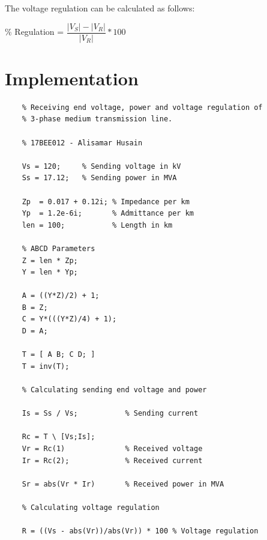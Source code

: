 \documentclass[a4paper,12pt]{article}
\begin{document}
    The voltage regulation can be calculated as follows:

      \begin{center}
        \% Regulation = $ \dfrac{|V_S| - |V_R|}{|V_R|} * 100 $
      \end{center}

  \section{Implementation}
  \begin{lstlisting}
    % Receiving end voltage, power and voltage regulation of
    % 3-phase medium transmission line.

    % 17BEE012 - Alisamar Husain

    Vs = 120;     % Sending voltage in kV
    Ss = 17.12;   % Sending power in MVA

    Zp  = 0.017 + 0.12i; % Impedance per km
    Yp  = 1.2e-6i;       % Admittance per km
    len = 100;           % Length in km

    % ABCD Parameters
    Z = len * Zp;
    Y = len * Yp;

    A = ((Y*Z)/2) + 1;
    B = Z;
    C = Y*(((Y*Z)/4) + 1);
    D = A;

    T = [ A B; C D; ]
    T = inv(T);

    % Calculating sending end voltage and power

    Is = Ss / Vs;           % Sending current

    Rc = T \ [Vs;Is];
    Vr = Rc(1)              % Received voltage
    Ir = Rc(2);             % Received current

    Sr = abs(Vr * Ir)       % Received power in MVA

    % Calculating voltage regulation

    R = ((Vs - abs(Vr))/abs(Vr)) * 100 % Voltage regulation
  \end{lstlisting}

  \pagebreak
\end{document}
